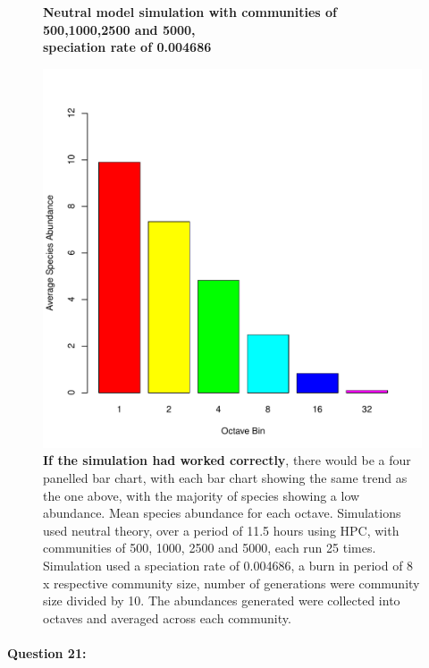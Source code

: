 \documentclass{article}
\begin{document}
\begin{figure}[H]
	\centering
	\textbf{Neutral model simulation with communities of 500,1000,2500 and 5000, \\ speciation rate of 0.004686}\par\medskip
	\includegraphics[width=\linewidth]{../Results/octave_plot.pdf}
	\caption{\textbf{If the simulation had worked correctly}, there would be a four panelled bar chart, with each bar chart showing the same trend as the one above, with the majority of species showing a low abundance. Mean species abundance for each octave. Simulations used neutral theory, over a period of 11.5 hours using HPC, with communities of 500, 1000, 2500 and 5000, each run 25 times. Simulation used a speciation rate of 0.004686, a burn in period of 8 x respective community size, number of generations were community size divided by 10. The abundances generated were collected into octaves and averaged across each community.}
	\label{fig:q20}
\end{figure}

\newpage
\paragraph{Question 21:}\
\end{document}
